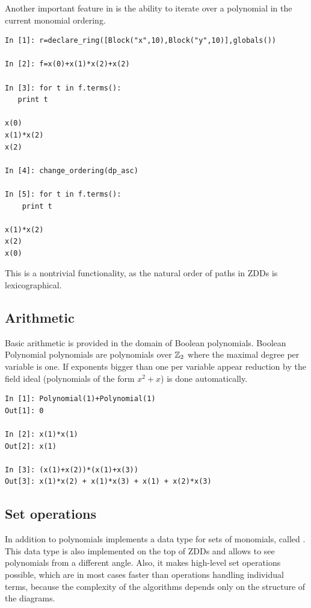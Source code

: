 Another important feature in \PolyBoRi is the ability to iterate over a polynomial in the current monomial ordering.

\begin{lstlisting}
In [1]: r=declare_ring([Block("x",10),Block("y",10)],globals())

In [2]: f=x(0)+x(1)*x(2)+x(2)

In [3]: for t in f.terms():
   print t
   
x(0)
x(1)*x(2)
x(2)

In [4]: change_ordering(dp_asc)

In [5]: for t in f.terms():
    print t

x(1)*x(2)
x(2)
x(0)
\end{lstlisting}
%
This is a nontrivial functionality, as the natural order of paths in ZDDs is lexicographical.


\subsection{Arithmetic}
Basic arithmetic is provided in the domain of Boolean polynomials. Boolean Polynomial polynomials are polynomials over $\mathbb{Z}_2$ where the maximal degree per variable is one.
If exponents bigger than one per variable appear reduction by the field ideal (polynomials of the form $x^2+x$) is done automatically.
\begin{lstlisting}
In [1]: Polynomial(1)+Polynomial(1)
Out[1]: 0

In [2]: x(1)*x(1)
Out[2]: x(1)

In [3]: (x(1)+x(2))*(x(1)+x(3))
Out[3]: x(1)*x(2) + x(1)*x(3) + x(1) + x(2)*x(3)
\end{lstlisting}

\subsection{Set operations}
In addition to polynomials  \PolyBoRi implements a data type for sets of monomials, called .
This data type is also implemented on the top of ZDDs and allows to see
polynomials
from a different angle. Also, it makes high-level set operations possible, which are in most cases faster than operations handling individual terms, because the complexity of the algorithms depends only on the structure of the diagrams.


